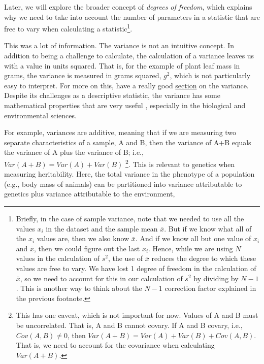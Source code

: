 \documentclass[
]{scrbook}
\begin{document}
Later, we will explore the broader concept of \emph{degrees of freedom}, which explains why we need to take into account the number of parameters in a statistic that are free to vary when calculating a statistic\footnote{Briefly, in the case of sample variance, note that we needed to use all the values \(x_{i}\) in the dataset and the sample mean \(\bar{x}\). But if we know what all of the \(x_{i}\) values are, then we also know \(\bar{x}\). And if we know all but one value of \(x_{i}\) and \(\bar{x}\), then we could figure out the last \(x_{i}\). Hence, while we are using \(N\) values in the calculation of \(s^{2}\), the use of \(\bar{x}\) reduces the degree to which these values are free to vary. We have lost 1 degree of freedom in the calculation of \(\bar{x}\), so we need to account for this in our calculation of \(s^{2}\) by dividing by \(N - 1\). This is another way to think about the \(N - 1\) correction factor \citep{Sokal1995} explained in the previous footnote.}.

This was a lot of information.
The variance is not an intuitive concept.
In addition to being a challenge to calculate, the calculation of a variance leaves us with a value in units squared.
That is, for the example of plant leaf mass in grams, the variance is measured in grams squared, \(g^{2}\), which is not particularly easy to interpret.
For more on this, \citet{Navarro2022} have a really good \href{https://davidfoxcroft.github.io/lsj-book/04-Descriptive-statistics.html\#variance}{section} on the variance.
Despite its challenges as a descriptive statistic, the variance has some mathematical properties that are very useful \citep{Navarro2022}, especially in the biological and environmental sciences.

For example, variances are additive, meaning that if we are measuring two separate characteristics of a sample, A and B, then the variance of A+B equals the variance of A plus the variance of B; i.e., \(Var(A + B) = Var(A) + Var(B)\) \footnote{This has one caveat, which is not important for now. Values of A and B must be uncorrelated. That is, A and B cannot covary. If A and B covary, i.e., \(Cov(A, B) \neq 0\), then \(Var(A+B) = Var(A) + Var(B) + Cov(A, B)\). That is, we need to account for the covariance when calculating \(Var(A+B)\).}.
This is relevant to genetics when measuring heritability.
Here, the total variance in the phenotype of a population (e.g., body mass of animals) can be partitioned into variance attributable to genetics plus variance attributable to the environment,
\end{document}
